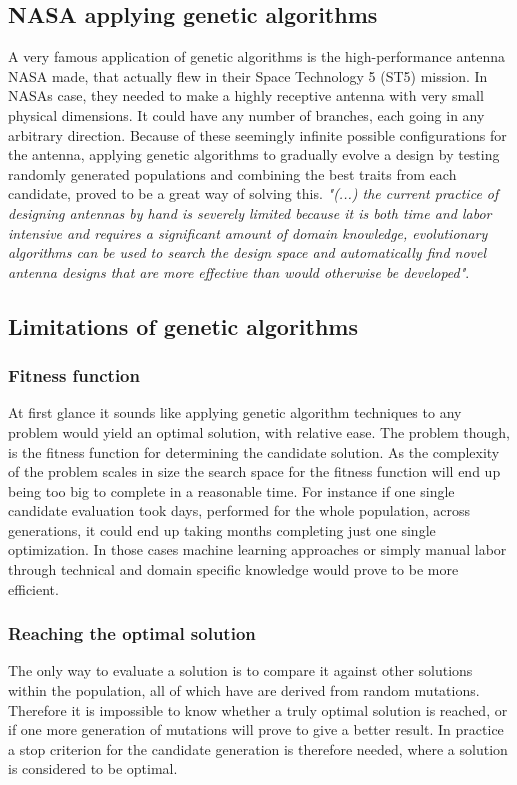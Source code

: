 \documentclass[a4paper,english]{report}
\begin{document}
			\subsection{NASA applying genetic algorithms}A very famous application of genetic algorithms is the high-performance antenna NASA made, that actually flew in their Space Technology 5 (ST5) mission\cite{nasa}. In NASAs case, they needed to make a highly receptive antenna with very small physical dimensions. It could have any number of branches, each going in any arbitrary direction. Because of these seemingly infinite possible configurations for the antenna, applying genetic algorithms to gradually evolve a design by testing randomly generated populations and combining the best traits from each candidate, proved to be a great way of solving this. \emph{"(...) the current practice of designing antennas by hand is severely limited because it is both time and labor intensive and requires a significant amount of domain knowledge, evolutionary algorithms can be used to search the design space and automatically find novel antenna designs that are more effective than would otherwise be developed"}\cite{nasa}.
			\subsection{Limitations of genetic algorithms}
			\subsubsection{Fitness function}
			At first glance it sounds like applying genetic algorithm techniques to any problem would yield an optimal solution, with relative ease. The problem though, is the fitness function for determining the candidate solution. As the complexity of the problem scales in size the search space for the fitness function will end up being too big to complete in a reasonable time. For instance if one single candidate evaluation took days, performed for the whole population, across generations, it could end up taking months completing just one single optimization. In those cases machine learning approaches or simply manual labor through technical and domain specific knowledge would prove to be more efficient.
			\subsubsection{Reaching the optimal solution}
			The only way to evaluate a solution is to compare it against other solutions within the population, all of which have are derived from random mutations. Therefore it is impossible to know whether a truly optimal solution is reached, or if one more generation of mutations will prove to give a better result. In practice a stop criterion for the candidate generation is therefore needed, where a solution is considered to be optimal.
\end{document}
